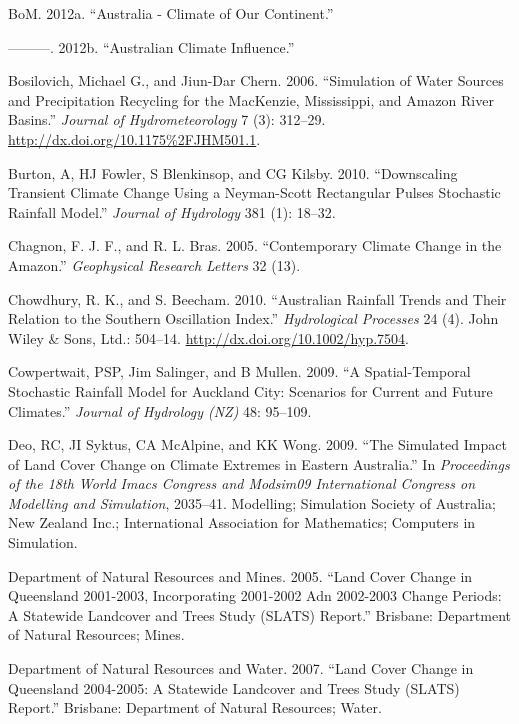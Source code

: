\documentclass[fleqn,10pt,lineno]{wlpeerj} %
\begin{document}
\hypertarget{ref-BoM2012a}{}
BoM. 2012a. ``Australia - Climate of Our Continent.''

\hypertarget{ref-BoM2012}{}
---------. 2012b. ``Australian Climate Influence.''

\hypertarget{ref-Bosilovich2006}{}
Bosilovich, Michael G., and Jiun-Dar Chern. 2006. ``Simulation of Water
Sources and Precipitation Recycling for the MacKenzie, Mississippi, and
Amazon River Basins.'' \emph{Journal of Hydrometeorology} 7 (3):
312--29. \url{http://dx.doi.org/10.1175\%2FJHM501.1}.

\hypertarget{ref-Burton2010}{}
Burton, A, HJ Fowler, S Blenkinsop, and CG Kilsby. 2010. ``Downscaling
Transient Climate Change Using a Neyman-Scott Rectangular Pulses
Stochastic Rainfall Model.'' \emph{Journal of Hydrology} 381 (1):
18--32.

\hypertarget{ref-Chagnon2005}{}
Chagnon, F. J. F., and R. L. Bras. 2005. ``Contemporary Climate Change
in the Amazon.'' \emph{Geophysical Research Letters} 32 (13).

\hypertarget{ref-Chowdhury2010}{}
Chowdhury, R. K., and S. Beecham. 2010. ``Australian Rainfall Trends and
Their Relation to the Southern Oscillation Index.'' \emph{Hydrological
Processes} 24 (4). John Wiley \& Sons, Ltd.: 504--14.
\url{http://dx.doi.org/10.1002/hyp.7504}.

\hypertarget{ref-Cowpertwait2009}{}
Cowpertwait, PSP, Jim Salinger, and B Mullen. 2009. ``A Spatial-Temporal
Stochastic Rainfall Model for Auckland City: Scenarios for Current and
Future Climates.'' \emph{Journal of Hydrology (NZ)} 48: 95--109.

\hypertarget{ref-Deo2009}{}
Deo, RC, JI Syktus, CA McAlpine, and KK Wong. 2009. ``The Simulated
Impact of Land Cover Change on Climate Extremes in Eastern Australia.''
In \emph{Proceedings of the 18th World Imacs Congress and Modsim09
International Congress on Modelling and Simulation}, 2035--41.
Modelling; Simulation Society of Australia; New Zealand Inc.;
International Association for Mathematics; Computers in Simulation.

\hypertarget{ref-SLATS2001}{}
Department of Natural Resources and Mines. 2005. ``Land Cover Change in
Queensland 2001-2003, Incorporating 2001-2002 Adn 2002-2003 Change
Periods: A Statewide Landcover and Trees Study (SLATS) Report.''
Brisbane: Department of Natural Resources; Mines.

\hypertarget{ref-SLATS2004}{}
Department of Natural Resources and Water. 2007. ``Land Cover Change in
Queensland 2004-2005: A Statewide Landcover and Trees Study (SLATS)
Report.'' Brisbane: Department of Natural Resources; Water.
\end{document}
